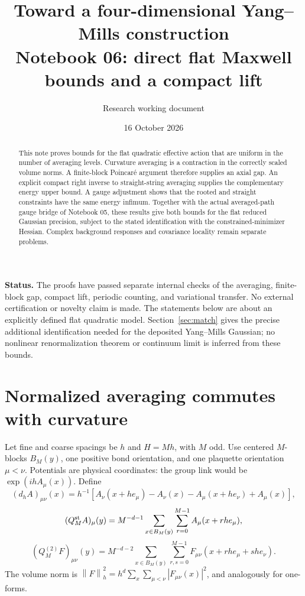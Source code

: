 \documentclass[11pt]{article}
\title{Toward a four-dimensional Yang--Mills construction\\
\large Notebook 06: direct flat Maxwell bounds and a compact lift}
\author{Research working document}
\date{16 October 2026}
\theoremstyle{remark}
\newcommand{\norm}[1]{\left\|#1\right\|}
\begin{document}
\maketitle

\begin{abstract}
This note proves bounds for the flat quadratic effective action that
are uniform in the number of averaging levels. Curvature averaging
is a contraction in the correctly scaled volume norms. A finite-block
Poincar\'e argument therefore supplies an axial gap. An explicit compact
right inverse to straight-string averaging supplies the complementary
energy upper bound. A gauge adjustment shows that the rooted and
straight constraints have the same energy infimum. Together with the
actual averaged-path gauge bridge of Notebook 05, these results give
both bounds for the flat reduced Gaussian precision, subject to the
stated identification with the constrained-minimizer Hessian. Complex
background responses and covariance locality remain separate problems.
\end{abstract}

\noindent\textbf{Status.}
The proofs have passed separate internal checks of the averaging,
finite-block gap, compact lift, periodic counting, and variational
transfer. No external certification or novelty claim is made.
The statements below are about an explicitly
defined flat quadratic model. Section~\ref{sec:match} gives the precise
additional identification needed for the deposited Yang--Mills
Gaussian; no nonlinear renormalization theorem or continuum limit is
inferred from these bounds.

\section{Normalized averaging commutes with curvature}

Let fine and coarse spacings be $h$ and $H=Mh$, with $M$ odd.
Use centered $M$-blocks $B_M(y)$, one positive bond orientation,
and one plaquette orientation $\mu<\nu$. Potentials are physical
coordinates: the group link would be $\exp(ihA_\mu(x))$.
Define
\[
 (d_hA)_{\mu\nu}(x)=h^{-1}
 [A_\nu(x+he_\mu)-A_\nu(x)
  -A_\mu(x+he_\nu)+A_\mu(x)],
\]
\[
 (Q_M^{\rm st}A)_\mu(y)=M^{-d-1}
 \sum_{x\in B_M(y)}\sum_{r=0}^{M-1}A_\mu(x+rhe_\mu),
\]
\[
 (Q_M^{(2)}F)_{\mu\nu}(y)=M^{-d-2}
 \sum_{x\in B_M(y)}\sum_{r,s=0}^{M-1}
 F_{\mu\nu}(x+rhe_\mu+she_\nu).
\]
The volume norm is
$\norm F_h^2=h^d\sum_x\sum_{\mu<\nu}|F_{\mu\nu}(x)|^2$,
and analogously for one-forms.
\end{document}
